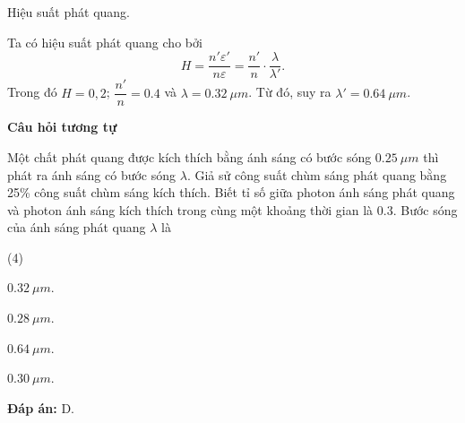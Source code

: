 \begin{dang}{Hiệu suất phát quang.}
{	Ta có hiệu suất phát quang cho bởi
$$
	H = \dfrac{n' \varepsilon'}{n \varepsilon} = \dfrac{n'}{n} \cdot \dfrac{\lambda}{\lambda'}.
$$	
Trong đó $ H = 0,2 $; $ \dfrac{n'}{n} = \num{0,4}$ và $ \lambda = \SI{0,32}{\mu m}$.
Từ đó, suy ra $ \lambda' = \SI{0,64}{\mu m}$.
	
	\begin{center}
	\textbf{Câu hỏi tương tự}
\end{center}

Một chất phát quang được kích thích bằng ánh sáng có bước sóng $ \SI{0,25}{\mu m} $ thì phát ra ánh sáng có bước sóng $\lambda $. Giả sử công suất chùm sáng phát quang bằng 25\% công suất chùm sáng kích thích. Biết tỉ số giữa photon ánh sáng phát quang và photon ánh sáng kích thích trong cùng một khoảng thời gian là $ \num{0,3} $. Bước sóng của ánh sáng phát quang $ \lambda $ là
		\begin{mcq}(4)
			\item $ \SI{0,32}{\mu m} $. 
			\item $ \SI{0,28}{\mu m} $.
			\item $ \SI{0,64}{\mu m} $. 
			\item $ \SI{0,30}{\mu m} $. 
		\end{mcq}
\textbf{Đáp án:} D.		
	}

\end{dang}